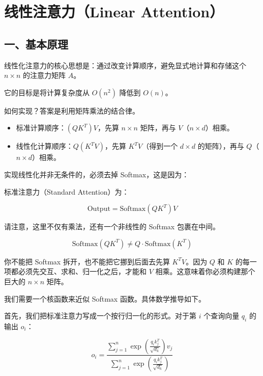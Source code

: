 \clearpage

\hypertarget{ux7ebfux6027ux6ce8ux610fux529blinear-attention}{%
\section{线性注意力（Linear Attention）}\label{ux7ebfux6027ux6ce8ux610fux529blinear-attention}}

\hypertarget{ux4e00ux57faux672cux539fux7406-1}{%
\subsection{一、基本原理}\label{ux4e00ux57faux672cux539fux7406-1}}

线性化注意力的核心思想是：通过改变计算顺序，避免显式地计算和存储这个 \(n \times n\) 的注意力矩阵 \(A\)。

它的目标是将计算复杂度从 \(O(n^2)\) 降低到 \(O(n)\)。

如何实现？答案是利用矩阵乘法的结合律。

\begin{itemize}
\tightlist
\item
  标准计算顺序：\((QK^T)V\)，先算 \(n \times n\) 矩阵，再与 \(V\)（\(n \times d\)）相乘。
\item
  线性化计算顺序：\(Q(K^T V)\)，先算 \(K^T V\)（得到一个 \(d \times d\) 的矩阵），再与 \(Q\)（\(n \times d\)）相乘。
\end{itemize}

实现线性化并非无条件的，必须去掉 Softmax，这是因为：

标准注意力（Standard Attention）为：

\[
\mathrm{Output} = \mathrm{Softmax}(QK^T)V
\]

请注意，这里不仅有乘法，还有一个非线性的 Softmax 包裹在中间。

\[
\mathrm{Softmax}(QK^T) \ne Q \cdot \mathrm{Softmax}(K^T)
\]

你不能把 Softmax 拆开，也不能把它挪到后面去先算 \(K^T V\)。因为 \(Q\) 和 \(K\) 的每一项都必须先交互、求和、归一化之后，才能和 \(V\) 相乘。这意味着你必须构建那个巨大的 \(n \times n\) 矩阵。

我们需要一个核函数来近似 Softmax 函数。具体数学推导如下。

首先，我们把标准注意力写成一个按行归一化的形式。对于第 \(i\) 个查询向量 \(q_i\) 的输出 \(o_i\)：

\[
o_i =
\frac{
\sum_{j=1}^{n} \exp\left(\frac{q_i k_j^T}{\sqrt{d_k}}\right)v_j
}{
\sum_{j=1}^{n} \exp\left(\frac{q_i k_j^T}{\sqrt{d_k}}\right)
}
\]

